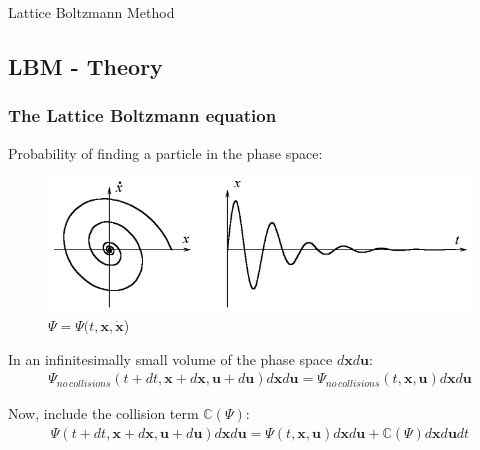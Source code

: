 \documentclass[10pt]{beamer}
\begin{document}
\begin{frame}[standout]
    Lattice Boltzmann Method
\end{frame}

\subsection{LBM - Theory}
\begin{frame}\frametitle{The Lattice Boltzmann equation}
Probability of finding a particle in the phase space:
\begin{figure}
  \begin{minipage}[c]{0.6\textwidth}
    \includegraphics[width=\textwidth]{obrazki/PhaseSpace.png} 
  \end{minipage}\hfill
  \begin{minipage}[c]{0.4\textwidth} %
    \caption{$\Psi = \Psi(t, \textbf{x}, \dot{\textbf{x}}$)} \label{fig:PhaseSpace}
  \end{minipage}
\end{figure}

\pause
In an infinitesimally small volume of the phase space $d\textbf{x} d\textbf{u} $:
\begin{eqnarray} 
	 \Psi_{no\,collisions}(t +dt, \textbf{x} + d\textbf{x}, \textbf{u} + d\textbf{u}) d\textbf{x} d\textbf{u} =
	 \Psi_{no\,collisions}(t, \textbf{x}, \textbf{u}) d\textbf{x} d\textbf{u}\nonumber
\end{eqnarray}

\pause
Now, include the collision term  $\mathbb{C}(\Psi)$:
\begin{eqnarray} \label{distributionFunctionEvolution}
	 \Psi(t +dt, \textbf{x} + d\textbf{x}, \textbf{u} + d\textbf{u})  d\textbf{x} d\textbf{u}=
	 \Psi(t, \textbf{x}, \textbf{u}) d\textbf{x} d\textbf{u} + \mathbb{C}(\Psi)  d\textbf{x} d\textbf{u} dt  \nonumber
\end{eqnarray} 
\end{frame} 
\end{document}
